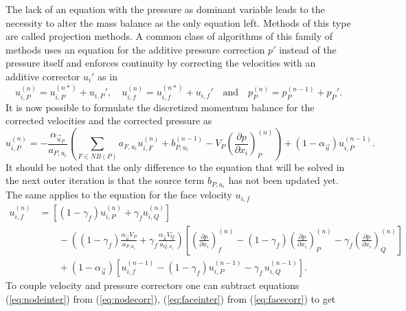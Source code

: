   The lack of an equation with the pressure as dominant variable leads to the necessity to alter the mass balance as the only equation left. Methods of this type are called projection methods. A common class of algorithms of this family of methods uses an equation for the additive pressure correction \(p'\) instead of the pressure itself and enforces continuity by correcting the velocities with an additive corrector \(u_i'\) as in
  \begin{displaymath}
    u_{i,P}^{(n)} =  u_{i,P}^{(n*)}  + u_{i,P}',\quad u_{i,f}^{(n)} =  u_{i,f}^{(n*)}  + u_{i,f}' \quad \text{and} \quad   p_P^{(n)} =  p_P^{(n-1)}  + p_P'.
  \end{displaymath}
  It is now possible to formulate the discretized momentum balance for the corrected velocities and the corrected pressure as
  \begin{equation}
    \label{eq:nodecorr}
    u_{i,P}^{(n)} 
    = 
    - \frac{\alpha_{\vec{u}_P}}{a_{P,u_i}} \left(\sum_{F \in NB(P)} a_{F,u_i} u_{i,F}^{(n)}
    +                                     b_{P,u_i}^{(n-1)} 
    -                                     V_P\left(\frac{\partial p}{\partial x_i}\right)_P^{(n)} \right)
    + \left(1 - \alpha_{\vec{u}}\right) u_{i,P}^{(n-1)}  .
  \end{equation}
  It should be noted that the only difference to the equation that will be solved in the next outer iteration is that the source term \(b_{P,u_i}\) has not been updated yet. The same applies to the equation for the face velocity \(u_{i,f}\)
  \begin{align}
    \label{eq:facecorr}
    u_{i,f}^{(n)} 
    &=
    \left[\left(1 - \gamma_f\right) u_{i,P}^{(n)} + \gamma_f u_{i,Q}^{(n)} \right] \nonumber\\[1em]
    &\quad\quad - 
    \left(\left(1 - \gamma_f\right) \frac{\alpha_\vec{u} V_P}{a_{P,u_i}} + \gamma_f \frac{\alpha_\vec{u} V_Q}{a_{Q,u_i}}\right)
    \left[ 
    \left(\frac{\partial p}{\partial x_i}\right)_f^{(n)} 
    -  \left(1 - \gamma_f\right) \left( \frac{\partial p}{\partial x_i} \right)_P^{(n)} 
    - \gamma_f \left(\frac{\partial p}{\partial x_i}\right)_Q^{(n)} 
    \right] \nonumber \\[1em]
    &\quad\quad + \left(1 - \alpha_\vec{u}\right) \left[ u_{i,f}^{(n-1)} - \left(1 - \gamma_f\right) u_{i,P}^{(n-1)} - \gamma_f \, u_{i,Q}^{(n-1)} \right].
  \end{align}
  To couple velocity and pressure correctors one can subtract equations (\ref{eq:nodeinter}) from (\ref{eq:nodecorr}), (\ref{eq:faceinter}) from (\ref{eq:facecorr}) to get
